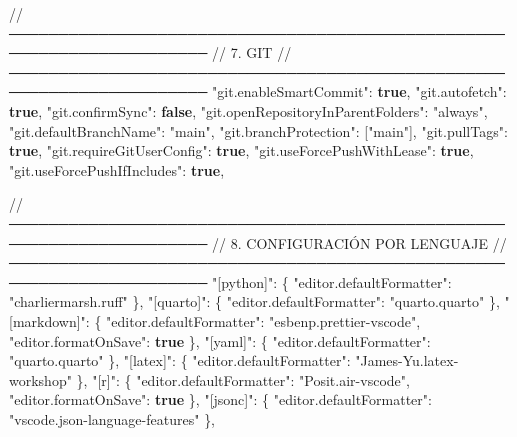 \documentclass[
  doc,
  floatsintext,
  longtable,
  a4paper,
  nolmodern,
  notxfonts,
  notimes,
  12pt,
  colorlinks=true,linkcolor=blue,citecolor=blue,urlcolor=blue]{apa7}
\newenvironment{Shaded}{\begin{snugshade}}{\end{snugshade}}
\newcommand{\DataTypeTok}[1]{\textcolor[rgb]{0.68,0.00,0.00}{#1}}
\newcommand{\ErrorTok}[1]{\textcolor[rgb]{0.68,0.00,0.00}{#1}}
\newcommand{\FunctionTok}[1]{\textcolor[rgb]{0.28,0.35,0.67}{#1}}
\newcommand{\KeywordTok}[1]{\textcolor[rgb]{0.00,0.23,0.31}{\textbf{#1}}}
\newcommand{\OtherTok}[1]{\textcolor[rgb]{0.00,0.23,0.31}{#1}}
\newcommand{\StringTok}[1]{\textcolor[rgb]{0.13,0.47,0.30}{#1}}
\begin{document}
\begin{Shaded}
\begin{Highlighting}[]
  \ErrorTok{//} \ErrorTok{──────────────────────────────────────────────────────────────────────}
  \ErrorTok{//} \ErrorTok{7.} \ErrorTok{GIT}
  \ErrorTok{//} \ErrorTok{──────────────────────────────────────────────────────────────────────}
  \DataTypeTok{"git.enableSmartCommit"}\FunctionTok{:} \KeywordTok{true}\FunctionTok{,}
  \DataTypeTok{"git.autofetch"}\FunctionTok{:} \KeywordTok{true}\FunctionTok{,}
  \DataTypeTok{"git.confirmSync"}\FunctionTok{:} \KeywordTok{false}\FunctionTok{,}
  \DataTypeTok{"git.openRepositoryInParentFolders"}\FunctionTok{:} \StringTok{"always"}\FunctionTok{,}
  \DataTypeTok{"git.defaultBranchName"}\FunctionTok{:} \StringTok{"main"}\FunctionTok{,}
  \DataTypeTok{"git.branchProtection"}\FunctionTok{:} \OtherTok{[}\StringTok{"main"}\OtherTok{]}\FunctionTok{,}
  \DataTypeTok{"git.pullTags"}\FunctionTok{:} \KeywordTok{true}\FunctionTok{,}
  \DataTypeTok{"git.requireGitUserConfig"}\FunctionTok{:} \KeywordTok{true}\FunctionTok{,}
  \DataTypeTok{"git.useForcePushWithLease"}\FunctionTok{:} \KeywordTok{true}\FunctionTok{,}
  \DataTypeTok{"git.useForcePushIfIncludes"}\FunctionTok{:} \KeywordTok{true}\FunctionTok{,}

  \ErrorTok{//} \ErrorTok{──────────────────────────────────────────────────────────────────────}
  \ErrorTok{//} \ErrorTok{8.} \ErrorTok{CONFIGURACIÓN} \ErrorTok{POR} \ErrorTok{LENGUAJE}
  \ErrorTok{//} \ErrorTok{──────────────────────────────────────────────────────────────────────}
  \DataTypeTok{"[python]"}\FunctionTok{:} \FunctionTok{\{}
    \DataTypeTok{"editor.defaultFormatter"}\FunctionTok{:} \StringTok{"charliermarsh.ruff"}
  \FunctionTok{\},}
  \DataTypeTok{"[quarto]"}\FunctionTok{:} \FunctionTok{\{}
    \DataTypeTok{"editor.defaultFormatter"}\FunctionTok{:} \StringTok{"quarto.quarto"}
  \FunctionTok{\},}
  \DataTypeTok{"[markdown]"}\FunctionTok{:} \FunctionTok{\{}
    \DataTypeTok{"editor.defaultFormatter"}\FunctionTok{:} \StringTok{"esbenp.prettier{-}vscode"}\FunctionTok{,}
    \DataTypeTok{"editor.formatOnSave"}\FunctionTok{:} \KeywordTok{true}
  \FunctionTok{\},}
  \DataTypeTok{"[yaml]"}\FunctionTok{:} \FunctionTok{\{}
    \DataTypeTok{"editor.defaultFormatter"}\FunctionTok{:} \StringTok{"quarto.quarto"}
  \FunctionTok{\},}
  \DataTypeTok{"[latex]"}\FunctionTok{:} \FunctionTok{\{}
    \DataTypeTok{"editor.defaultFormatter"}\FunctionTok{:} \StringTok{"James{-}Yu.latex{-}workshop"}
  \FunctionTok{\},}
  \DataTypeTok{"[r]"}\FunctionTok{:} \FunctionTok{\{}
    \DataTypeTok{"editor.defaultFormatter"}\FunctionTok{:} \StringTok{"Posit.air{-}vscode"}\FunctionTok{,}
    \DataTypeTok{"editor.formatOnSave"}\FunctionTok{:} \KeywordTok{true}
  \FunctionTok{\},}
  \DataTypeTok{"[jsonc]"}\FunctionTok{:} \FunctionTok{\{}
    \DataTypeTok{"editor.defaultFormatter"}\FunctionTok{:} \StringTok{"vscode.json{-}language{-}features"}
  \FunctionTok{\},}


\end{Highlighting}
\end{Shaded}
\end{document}
